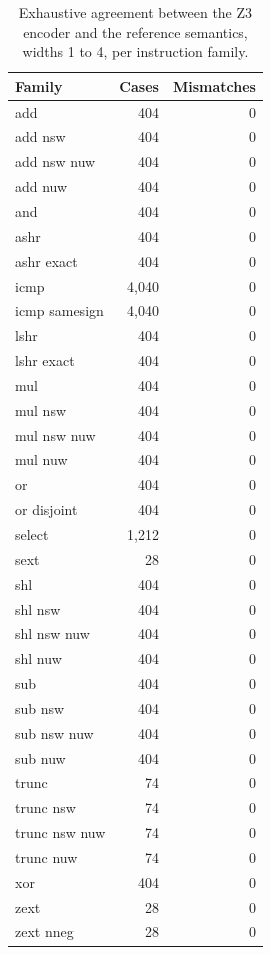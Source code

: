\begin{table}[t]
\centering
\caption{Exhaustive agreement between the Z3 encoder and the reference semantics, widths 1 to 4, per instruction family.}
\label{tab:encoding}
\setlength{\tabcolsep}{3pt}
\begin{tabular}{|l|r|r|}
\hline
Family & Cases & Mismatches \\
\hline
add & 404 & 0 \\
\hline
add nsw & 404 & 0 \\
\hline
add nsw nuw & 404 & 0 \\
\hline
add nuw & 404 & 0 \\
\hline
and & 404 & 0 \\
\hline
ashr & 404 & 0 \\
\hline
ashr exact & 404 & 0 \\
\hline
icmp & 4,040 & 0 \\
\hline
icmp samesign & 4,040 & 0 \\
\hline
lshr & 404 & 0 \\
\hline
lshr exact & 404 & 0 \\
\hline
mul & 404 & 0 \\
\hline
mul nsw & 404 & 0 \\
\hline
mul nsw nuw & 404 & 0 \\
\hline
mul nuw & 404 & 0 \\
\hline
or & 404 & 0 \\
\hline
or disjoint & 404 & 0 \\
\hline
select & 1,212 & 0 \\
\hline
sext & 28 & 0 \\
\hline
shl & 404 & 0 \\
\hline
shl nsw & 404 & 0 \\
\hline
shl nsw nuw & 404 & 0 \\
\hline
shl nuw & 404 & 0 \\
\hline
sub & 404 & 0 \\
\hline
sub nsw & 404 & 0 \\
\hline
sub nsw nuw & 404 & 0 \\
\hline
sub nuw & 404 & 0 \\
\hline
trunc & 74 & 0 \\
\hline
trunc nsw & 74 & 0 \\
\hline
trunc nsw nuw & 74 & 0 \\
\hline
trunc nuw & 74 & 0 \\
\hline
xor & 404 & 0 \\
\hline
zext & 28 & 0 \\
\hline
zext nneg & 28 & 0 \\
\hline
\end{tabular}
\end{table}
